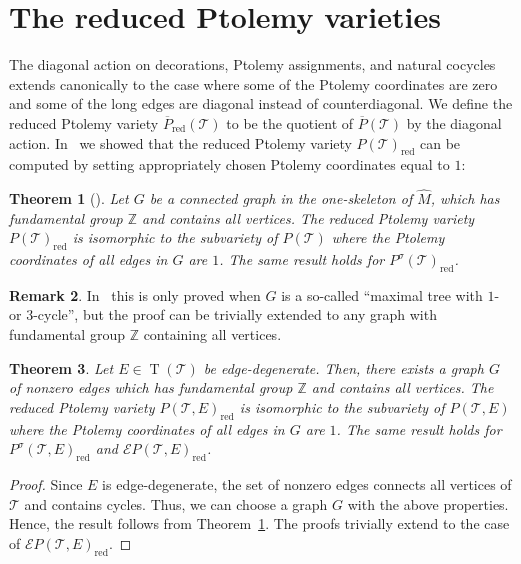 \documentclass[11pt]{amsart}
\theoremstyle{plain}
\newtheorem{theorem}{Theorem}[section]
\theoremstyle{definition}
\newtheorem{remark}[theorem]{Remark}
\numberwithin{equation}{section}
\newcommand{\Z}{\mathbb Z}
\newcommand{\T}{\mathcal T}
\newcommand{\E}{\mathcal E}
\DeclareMathOperator{\red}{red}
\DeclareMathOperator{\TE}{T}
\begin{document}


\section{The reduced Ptolemy varieties}
The diagonal action on decorations, Ptolemy assignments, and natural cocycles extends canonically to the case where some of the Ptolemy coordinates are zero and some of the long edges are diagonal instead of counterdiagonal. We define the reduced Ptolemy variety $\overline P_{\red}(\T)$ to be the quotient of $\overline P(\T)$ by the diagonal action. 
In~\cite{PtolemyField} we showed that the reduced Ptolemy variety $P(\T)_{\red}$ can be computed by setting appropriately chosen Ptolemy coordinates equal to $1$: %
\begin{theorem}[{\cite[Prop.~1.16]{PtolemyField}}]\label{thm:SetEdgesToOne} Let $G$ be a connected graph in the one-skeleton of $\widehat M$, which has fundamental group $\Z$ and contains all vertices. The reduced Ptolemy variety $P(\T)_{\red}$ is isomorphic to the subvariety of $P(\T)$ where the Ptolemy coordinates of all edges in $G$ are $1$. The same result holds for $P^\sigma(\T)_{\red}$.
\end{theorem}
\begin{remark}
In~\cite{PtolemyField} this is only proved when $G$ is a so-called ``maximal tree with $1$- or $3$-cycle'', but the proof can be trivially extended to any graph with fundamental group $\Z$ containing all vertices.
\end{remark}

\begin{theorem}\label{thm:Reduced} Let $E\in \TE(\T)$ be edge-degenerate. Then, there exists a graph $G$ of nonzero edges which has fundamental group $\Z$ and contains all vertices. The reduced Ptolemy variety $P(\T,E)_{\red}$ is isomorphic to the subvariety of $P(\T,E)$ where the Ptolemy coordinates of all edges in $G$ are $1$. The same result holds for $P^\sigma(\T,E)_{\red}$ and $\E P(\T,E)_{\red}$.
\end{theorem}
\begin{proof}
Since $E$ is edge-degenerate, the set of nonzero edges connects all vertices of $\T$ and contains cycles. Thus, we can choose a graph $G$ with the above properties. Hence, the result follows from Theorem~\ref{thm:SetEdgesToOne}. The proofs trivially extend to the case of $\E P(\T,E)_{\red}$.
\end{proof}
\end{document}
